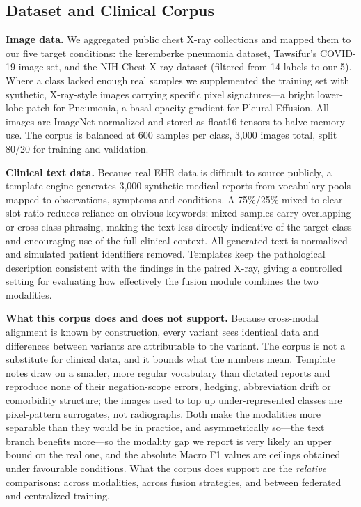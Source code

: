 \documentclass[letterpaper, conference]{IEEEtran}
\begin{document}
\subsection{Dataset and Clinical Corpus}

\textbf{Image data.}
We aggregated public chest X-ray collections and mapped them to our five target
conditions: the keremberke pneumonia dataset, Tawsifur's COVID-19 image set, and
the NIH Chest X-ray dataset (filtered from 14 labels to our 5). Where a class
lacked enough real samples we supplemented the training set with synthetic,
X-ray-style images carrying specific pixel signatures---a bright lower-lobe patch
for Pneumonia, a basal opacity gradient for Pleural Effusion. All images are
ImageNet-normalized and stored as float16 tensors to halve memory use. The corpus
is balanced at 600 samples per class, 3,000 images total, split 80/20 for
training and validation.

\textbf{Clinical text data.}
Because real EHR data is difficult to source publicly, a template engine
generates 3,000 synthetic medical reports from vocabulary pools mapped to
observations, symptoms and conditions. A 75\%/25\% mixed-to-clear slot ratio
reduces reliance on obvious keywords: mixed samples carry overlapping or
cross-class phrasing, making the text less directly indicative of the target
class and encouraging use of the full clinical context. All generated text is
normalized and simulated patient identifiers removed. Templates keep the
pathological description consistent with the findings in the paired X-ray, giving
a controlled setting for evaluating how effectively the fusion module combines
the two modalities.

\label{sec:corpus}
\textbf{What this corpus does and does not support.}
Because cross-modal alignment is known by construction, every variant sees
identical data and differences between variants are attributable to the variant.
The corpus is not a substitute for clinical data, and it bounds what the numbers
mean. Template notes draw on a smaller, more regular vocabulary than dictated
reports and reproduce none of their negation-scope errors, hedging, abbreviation
drift or comorbidity structure; the images used to top up under-represented
classes are pixel-pattern surrogates, not radiographs. Both make the modalities
more separable than they would be in practice, and asymmetrically so---the text
branch benefits more---so the modality gap we report is very likely an upper
bound on the real one, and the absolute Macro F1 values are ceilings obtained
under favourable conditions. What the corpus does support are the \emph{relative}
comparisons: across modalities, across fusion strategies, and between federated
and centralized training.
\end{document}
